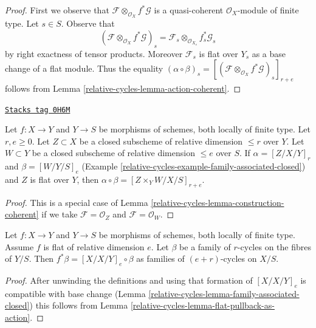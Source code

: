 \begin{proof}
First we observe that $\mathcal{F} \otimes_{\mathcal{O}_X} f^*\mathcal{G}$
is a quasi-coherent $\mathcal{O}_X$-module of finite type.
Let $s \in S$. Observe that
$$
(\mathcal{F} \otimes_{\mathcal{O}_X} f^*\mathcal{G})_s =
\mathcal{F}_s \otimes_{\mathcal{O}_{X_s}} f_s^*\mathcal{G}_s
$$
by right exactness of tensor products. Moreover $\mathcal{F}_s$
is flat over $Y_s$ as a base change of a flat module. Thus the equality
$(\alpha \circ \beta)_s =
[(\mathcal{F} \otimes_{\mathcal{O}_X} f^*\mathcal{G})_s]_{r + e}$
follows from Lemma \ref{relative-cycles-lemma-action-coherent}.
\end{proof}

\begin{lemma}
\label{relative-cycles-lemma-construction-closed}
\href{https://stacks.math.columbia.edu/tag/0H6M}{\texttt{Stacks tag 0H6M}}

Let $f : X \to Y$ and $Y \to S$ be morphisms of schemes, both locally of
finite type. Let $r, e \geq 0$. Let $Z \subset X$ be a closed
subscheme of relative dimension $\leq r$ over $Y$.
Let $W \subset Y$ be a closed subscheme of relative dimension $\leq e$
over $S$. If $\alpha = [Z/X/Y]_r$ and $\beta = [W/Y/S]_e$
(Example \ref{relative-cycles-example-family-associated-closed}) and $Z$ is flat over $Y$,
then $\alpha \circ \beta = [Z \times_Y W/X/S]_{r + e}$.
\end{lemma}

\begin{proof}
This is a special case of Lemma \ref{relative-cycles-lemma-construction-coherent}
if we take $\mathcal{F} = \mathcal{O}_Z$ and $\mathcal{F} = \mathcal{O}_W$.
\end{proof}

\begin{lemma}
\label{relative-cycles-lemma-flat-pullback-as-composition}

Let $f : X \to Y$ and $Y \to S$ be morphisms of schemes, both locally of
finite type. Assume $f$ is flat of relative dimension $e$. Let $\beta$ be
a family of $r$-cycles on the fibres of $Y/S$. Then
$f^*\beta = [X/X/Y]_e \circ \beta$
as families of $(e + r)$-cycles on $X/S$.
\end{lemma}

\begin{proof}
After unwinding the definitions and using that formation of
$[X/X/Y]_e$ is compatible with base change
(Lemma \ref{relative-cycles-lemma-family-associated-closed}) this follows from
Lemma \ref{relative-cycles-lemma-flat-pullback-as-action}.
\end{proof}

